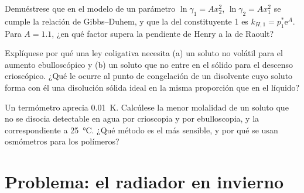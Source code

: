 \begin{exercise}[$\star\star\star$]\label{exo:b2:chemical-potential:10}
Demuéstrese que en el modelo de un parámetro $\ln\gamma_1 = Ax_2^2$, $\ln\gamma_2 =
Ax_1^2$ se cumple la relación de Gibbs--Duhem, y que la  del
constituyente 1 es $k_{H,1} = p_1^*\mathrm e^A$. Para $A = 1.1$, ¿en qué factor
supera la pendiente de Henry a la de Raoult?
\end{exercise}

\begin{exercise}[$\star\star\star$]\label{exo:b2:chemical-potential:11}
Explíquese por qué una ley coligativa necesita (a) un soluto no volátil para el
aumento ebulloscópico y (b) un soluto que no entre en el sólido para
el descenso crioscópico. ¿Qué le ocurre al punto de congelación de un
disolvente cuyo soluto forma con él una disolución sólida ideal en la misma
proporción que en el líquido?
\end{exercise}

\begin{exercise}[$\star\star\star$]\label{exo:b2:chemical-potential:12}
Un termómetro aprecia \qty{0.01}{K}. Calcúlese la menor molalidad de un
soluto que no se disocia detectable en agua por crioscopia y por
ebulloscopia, y la  correspondiente a \qty{25}{\celsius}.
¿Qué método es el más sensible, y por qué se usan osmómetros para los polímeros?
\end{exercise}

\section{Problema: el radiador en invierno}

